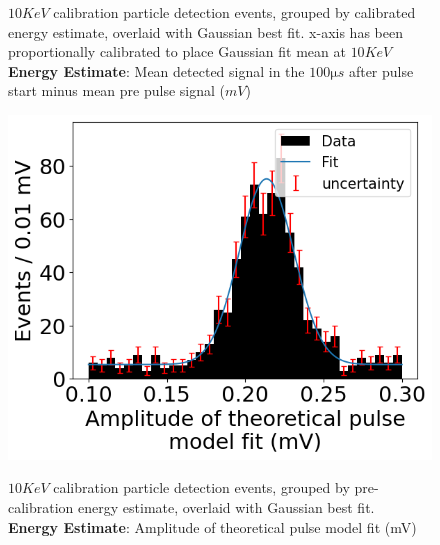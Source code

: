 \begin{figure}[H]
\begin{minipage}[t]{0.45\linewidth}
\begin{center}
			\caption{
                $10\unit{KeV}$ calibration particle detection events, grouped by calibrated energy estimate, overlaid with Gaussian best fit. x-axis has been proportionally calibrated to place Gaussian fit mean at $10\unit{KeV}$ \\
                \textbf{Energy Estimate}: Mean detected signal in the $100\unit{\micro s}$ after pulse start minus mean pre pulse signal  ($\unit{mV}$)
            }
		\end{center}
	\end{minipage}
\end{figure}
\begin{figure}[H]
	\begin{minipage}[t]{0.45\linewidth}
		\begin{center}
            \label{fig::pulseFit}
			\includegraphics[width=\textwidth]{figures/pulseFit.png}
			\caption{
                $10\unit{KeV}$ calibration particle detection events, grouped by pre-calibration energy estimate, overlaid with Gaussian best fit.\\
                \textbf{Energy Estimate}: Amplitude of theoretical pulse model fit (mV)
            }
		\end{center}
	\end{minipage}
    \hfill
	\begin{minipage}[t]{0.45\linewidth}
		\begin{center}
            \label{fig::pulseFit--cal}

\end{center}
\end{minipage}
\end{figure}
